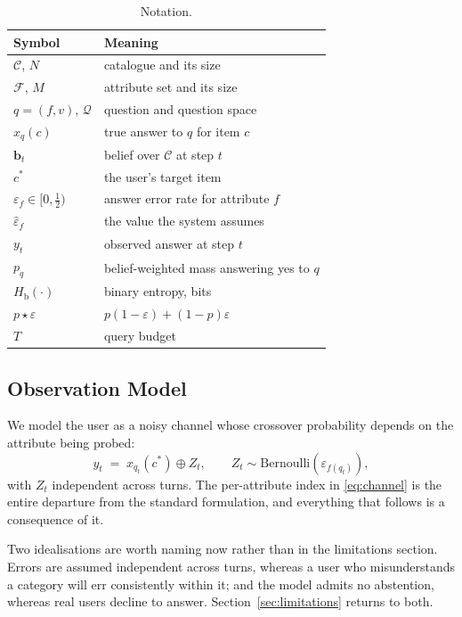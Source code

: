 \documentclass[conference]{IEEEtran}
\newcommand{\bb}{\mathbf{b}}
\newcommand{\Hb}{H_{\mathrm{b}}}
\newcommand{\Cat}{\mathcal{C}}
\newcommand{\Qset}{\mathcal{Q}}
\newcommand{\Fset}{\mathcal{F}}
\begin{document}
\begin{table}[t]
\caption{Notation.}
\label{tab:notation}
\centering
\footnotesize
\begin{tabular}{@{}ll@{}}
\toprule
\textbf{Symbol} & \textbf{Meaning} \\
\midrule
$\Cat$, $N$ & catalogue and its size \\
$\Fset$, $M$ & attribute set and its size \\
$q=(f,v)$, $\Qset$ & question and question space \\
$x_q(c)$ & true answer to $q$ for item $c$ \\
$\bb_t$ & belief over $\Cat$ at step $t$ \\
$c^\ast$ & the user's target item \\
$\varepsilon_f \in [0,\tfrac12)$ & answer error rate for attribute $f$ \\
$\hat\varepsilon_f$ & the value the system assumes \\
$y_t$ & observed answer at step $t$ \\
$p_q$ & belief-weighted mass answering yes to $q$ \\
$\Hb(\cdot)$ & binary entropy, bits \\
$p \star \varepsilon$ & $p(1-\varepsilon)+(1-p)\varepsilon$ \\
$T$ & query budget \\
\bottomrule
\end{tabular}
\end{table}

\subsection{Observation Model}

We model the user as a noisy channel whose crossover probability depends on the
attribute being probed:
\begin{equation}
y_t \;=\; x_{q_t}(c^\ast) \oplus Z_t, \qquad
Z_t \sim \mathrm{Bernoulli}\!\left(\varepsilon_{f(q_t)}\right),
\label{eq:channel}
\end{equation}
with $Z_t$ independent across turns. The per-attribute index in
\eqref{eq:channel} is the entire departure from the standard formulation, and
everything that follows is a consequence of it.

Two idealisations are worth naming now rather than in the limitations section.
Errors are assumed independent across turns, whereas a user who misunderstands
a category will err consistently within it; and the model admits no abstention,
whereas real users decline to answer. Section~\ref{sec:limitations} returns to
both.
\end{document}
